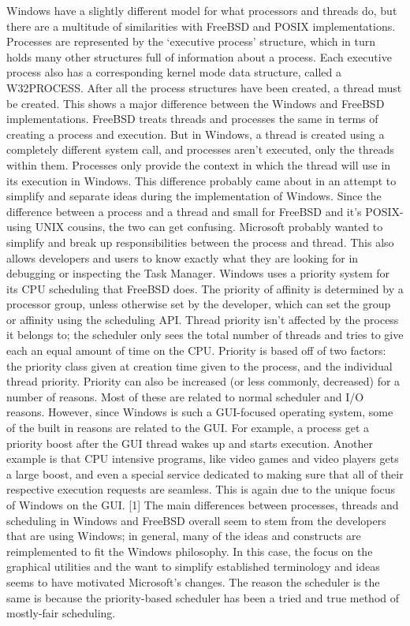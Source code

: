 \documentclass[titlepage]{article}
\begin{document}
\begin{singlespace}
    Windows have a slightly different model for what processors and threads do, but there are a multitude of similarities with FreeBSD and POSIX implementations. 
    Processes are represented by the ‘executive process’ structure, which in turn holds many other structures full of information about a process. Each executive process also has a corresponding kernel mode data structure, called a W32PROCESS. After all the process structures have been created, a thread must be created. This shows a major difference between the Windows and FreeBSD implementations. FreeBSD treats threads and processes the same in terms of creating a process and execution. But in Windows, a thread is created using a completely different system call, and processes aren’t executed, only the threads within them. Processes only provide the context in which the thread will use in its execution in Windows. 
    This difference probably came about in an attempt to simplify and separate ideas during the implementation of Windows. Since the difference between a process and a thread and small for FreeBSD and it’s POSIX-using UNIX cousins, the two can get confusing. Microsoft probably wanted to simplify and break up responsibilities between the process and thread. This also allows developers and users to know exactly what they are looking for in debugging or inspecting the Task Manager.
    Windows uses a priority system for its CPU scheduling that FreeBSD does. The priority of affinity is determined by a processor group, unless otherwise set by the developer, which can set the group or affinity using the scheduling API. Thread priority isn’t affected by the process it belongs to; the scheduler only sees the total number of threads and tries to give each an equal amount of time on the CPU. 
    Priority is based off of two factors: the priority class given at creation time given to the process, and the individual thread priority. Priority can also be increased (or less commonly, decreased) for a number of reasons. Most of these are related to normal scheduler and I/O reasons. However, since Windows is such a GUI-focused operating system, some of the built in reasons are related to the GUI. For example, a process get a priority boost after the GUI thread wakes up and starts execution. Another example is that CPU intensive programs, like video games and video players gets a large boost, and even a special service dedicated to making sure that all of their respective execution requests are seamless. This is again due to the unique focus of Windows on the GUI. [1]
    The main differences between processes, threads and scheduling in Windows and FreeBSD overall seem to stem from the developers that are using Windows; in general, many of the ideas and constructs are reimplemented to fit the Windows philosophy. In this case, the focus on the graphical utilities and the want to simplify established terminology and ideas seems to have motivated Microsoft’s changes. The reason the scheduler is the same is because the priority-based scheduler has been a tried and true method of mostly-fair scheduling.

 
\end{singlespace}
\end{document}
